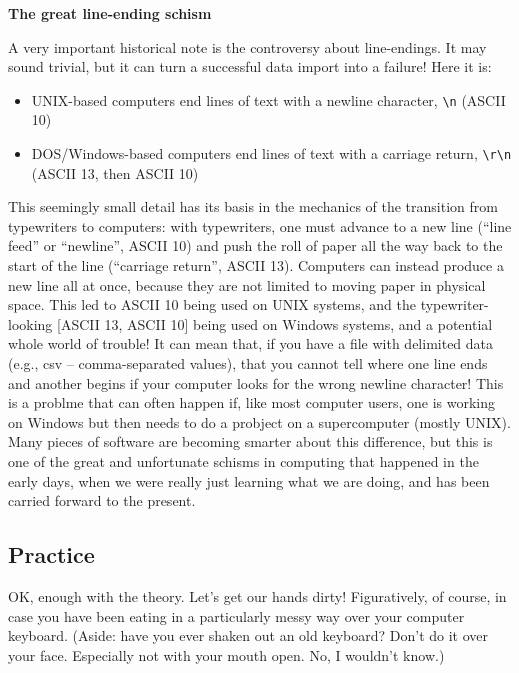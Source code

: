 \documentclass[a4paper,10pt]{scrartcl}
\begin{document}
\begin{framed}
\noindent\textbf{The great line-ending schism}

A very important historical note is the controversy about line-endings. It may sound trivial, but it can turn a successful data import into a failure! Here it is:
\begin{itemize}
 \item UNIX-based computers end lines of text with a newline character, \lstinline{\n} (ASCII 10)
 \item DOS/Windows-based computers end lines of text with a carriage return, \lstinline{\r\n} (ASCII 13, then ASCII 10)
\end{itemize}
This seemingly small detail has its basis in the mechanics of the transition from typewriters to computers: with typewriters, one must advance to a new line (``line feed'' or ``newline'', ASCII 10) and push the roll of paper all the way back to the start of the line (``carriage return'', ASCII 13). Computers can instead produce a new line all at once, because they are not limited to moving paper in physical space. This led to ASCII 10 being used on UNIX systems, and the typewriter-looking [ASCII 13, ASCII 10] being used on Windows systems, and a potential whole world of trouble! It can mean that, if you have a file with delimited data (e.g., csv -- comma-separated values), that you cannot tell where one line ends and another begins if your computer looks for the wrong newline character! This is a problme that can often happen if, like most computer users, one is working on Windows but then needs to do a probject on a supercomputer (mostly UNIX). Many pieces of software are becoming smarter about this difference, but this is one of the great and unfortunate schisms in computing that happened in the early days, when we were really just learning what we are doing, and has been carried forward to the present.
\end{framed}

\subsection{Practice}

OK, enough with the theory. Let's get our hands dirty! Figuratively, of course, in case you have been eating in a particularly messy way over your computer keyboard. (Aside: have you ever shaken out an old keyboard? Don't do it over your face. Especially not with your mouth open. No, I wouldn't know.)
\end{document}

